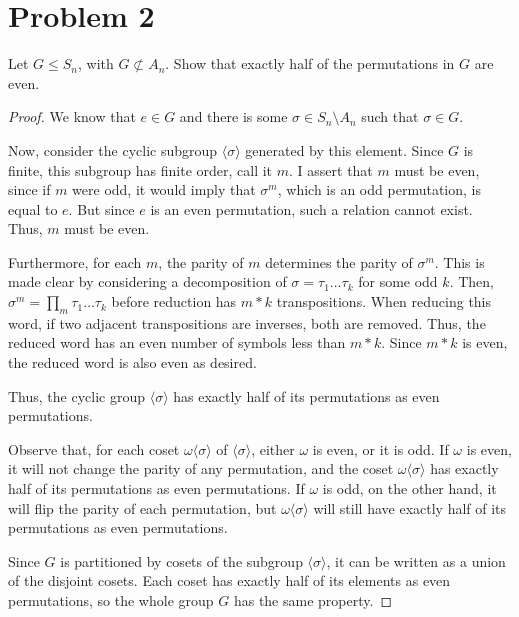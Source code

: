\documentclass[paper=a4, fontsize=11pt]{scrartcl} %
\numberwithin{equation}{section} %
\numberwithin{figure}{section} %
\numberwithin{table}{section} %
\begin{document}
\section*{Problem 2}
Let $G\leq S_n$, with $G\not\subset A_n$. Show that exactly half of the permutations in
$G$ are even.
\\
\begin{proof}
We know that $e\in G$ and there is some $\sigma\in S_n\setminus A_n$ such that $\sigma\in G$.

Now, consider the cyclic subgroup $\langle \sigma \rangle$ generated by this element. Since
$G$ is finite, this subgroup has finite order, call it $m$. I assert that $m$ must be even, since
if $m$ were odd, it would imply that $\sigma^m$, which is an odd permutation, is equal to $e$. But
since $e$ is an even permutation, such a relation cannot exist. Thus, $m$ must be even. 

Furthermore, for each $m$, the parity of $m$ determines the parity of $\sigma^m$.
This is made clear by considering a decomposition of $\sigma = \tau_1\ldots\tau_k$ for some
odd $k$. Then, $\sigma^m = \prod_m \tau_1\ldots\tau_k$ before reduction has $m*k$ transpositions.
When reducing this word, if two adjacent transpositions are inverses, both are removed. Thus, the 
reduced word has an even number of symbols less than $m*k$. Since $m*k$ is even, the reduced word
is also even as desired.

Thus, the cyclic group $\langle \sigma \rangle$ has exactly half of its permutations as even permutations.

Observe that, for each coset $\omega\langle\sigma\rangle$ of $\langle\sigma\rangle$, either $\omega$ is even,
or it is odd. If $\omega$ is even, it will not change the parity of any permutation, and the coset
$\omega\langle\sigma\rangle$ has exactly half of its permutations as even permutations.
If $\omega$ is odd, on the other hand, it will flip the parity of each permutation, but $\omega\langle\sigma\rangle$
will still have exactly half of its permutations as even permutations.

Since $G$ is partitioned by cosets of the subgroup $\langle\sigma\rangle$, it can be written as
a union of the disjoint cosets. Each coset has exactly half of its elements as even permutations,
so the whole group $G$ has the same property.
\end{proof}
\end{document}
